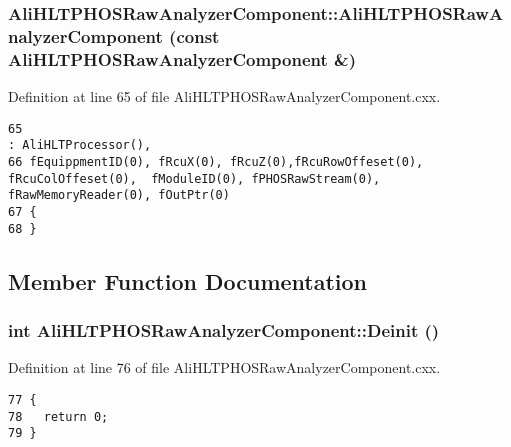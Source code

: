 \subsubsection{\setlength{\rightskip}{0pt plus 5cm}Ali\-HLTPHOSRaw\-Analyzer\-Component::Ali\-HLTPHOSRaw\-Analyzer\-Component (const {\bf Ali\-HLTPHOSRaw\-Analyzer\-Component} \&)}\label{classAliHLTPHOSRawAnalyzerComponent_AliHLTPHOSRawAnalyzerComponenta2}




Definition at line 65 of file Ali\-HLTPHOSRaw\-Analyzer\-Component.cxx.

\footnotesize\begin{verbatim}65                                                                                                       : AliHLTProcessor(), 
66 fEquippmentID(0), fRcuX(0), fRcuZ(0),fRcuRowOffeset(0), fRcuColOffeset(0),  fModuleID(0), fPHOSRawStream(0), fRawMemoryReader(0), fOutPtr(0)
67 {
68 }
\end{verbatim}\normalsize 




\subsection{Member Function Documentation}
\subsubsection{\setlength{\rightskip}{0pt plus 5cm}int Ali\-HLTPHOSRaw\-Analyzer\-Component::Deinit ()\hspace{0.3cm}{\tt  [virtual]}}\label{classAliHLTPHOSRawAnalyzerComponent_AliHLTPHOSRawAnalyzerPeakFinderComponenta5}




Definition at line 76 of file Ali\-HLTPHOSRaw\-Analyzer\-Component.cxx.

\footnotesize\begin{verbatim}77 {
78   return 0;
79 }
\end{verbatim}\normalsize 



